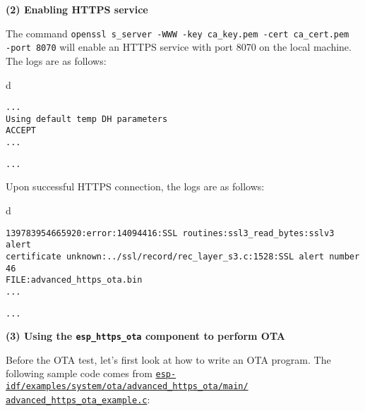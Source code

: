 \documentclass[a4paper,12pt]{book}
\begin{document}
\vspace{6pt}
\textbf{(2) Enabling HTTPS service}

The command \verb|openssl s_server -WWW -key ca_key.pem -cert ca_cert.pem |\\ \verb|-port 8070| will enable an HTTPS service with port 8070 on the local machine. The logs are as follows:

\begin{codebloc}
\begin{tabular}{d}
\vspace{2pt}
\begin{verbatim}
...
Using default temp DH parameters
ACCEPT
...
\end{verbatim}
\verb|...|
\end{tabular}
\end{codebloc}

Upon successful HTTPS connection, the logs are as follows:

\begin{codebloc}
\begin{tabular}{d}
\vspace{2pt}
\begin{verbatim}
139783954665920:error:14094416:SSL routines:ssl3_read_bytes:sslv3 alert 
certificate unknown:../ssl/record/rec_layer_s3.c:1528:SSL alert number 46
FILE:advanced_https_ota.bin
...
\end{verbatim}
\verb|...|
\end{tabular}
\end{codebloc}

\vspace{6pt}
\textbf{(3)	Using the \texttt{esp\_https\_ota} component to perform OTA}

Before the OTA test, let’s first look at how to write an OTA program. The following sample code comes from \href{https://github.com/espressif/esp-idf/blob/master/examples/system/ota/advanced_https_ota/main/advanced_https_ota_example.c}{\texttt{esp-idf/examples/system/ota/advanced\_https\_ota/main/\\ advanced\_https\_ota\_example.c}}:
\end{document}
